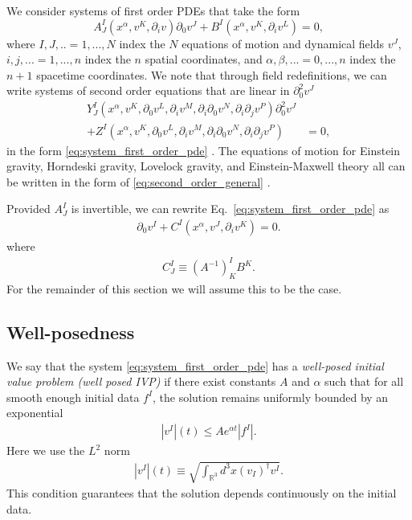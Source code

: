 \documentclass{ws-ijmpd}
\begin{document}
We consider systems of first order PDEs that take the form
\begin{equation}
\label{eq:system_first_order_pde}
   A^I_J\left(x^{\alpha},v^K,\partial_iv\right)\partial_0v^J
   +
   B^I\left(x^{\alpha},v^K,\partial_iv^L\right)
   =
   0
   ,
\end{equation} 
where $I,J,..=1,...,N$ index the $N$ 
equations of motion and dynamical fields $v^J$,
$i,j,...=1,...,n$ index the $n$ spatial coordinates, 
and $\alpha,\beta,...=0,...,n$ index
the $n+1$ spacetime coordinates.
We note that through field redefinitions, we can write
systems of second order equations that are linear in $\partial_0^2v^J$
\begin{align}
\label{eq:second_order_general}
   Y^I_J\left(
      x^{\alpha},
      v^K,
      \partial_0v^L,
      \partial_iv^M,
      \partial_i\partial_0v^N,
      \partial_i\partial_jv^P
   \right)
   \partial_0^2v^J
   &\nonumber\\
   +
   Z^I\left(
      x^{\alpha},
      v^K,
      \partial_0v^L,
      \partial_iv^M,
      \partial_i\partial_0v^N,
      \partial_i\partial_jv^P
   \right)
   &=
   0
   ,
\end{align}
in the form 
\eqref{eq:system_first_order_pde}
\cite{Sarbach:2012pr,Hilditch:2013sba,Kovacs:2020pns}.
The equations of motion for Einstein gravity, 
Horndeski gravity, Lovelock
gravity, and Einstein-Maxwell theory all can be
written in the form of
\eqref{eq:second_order_general}
\cite{Papallo:2017qvl,Kovacs:2020pns,Davies:2021frz}.

Provided $A^I_J$ is invertible, we can rewrite
Eq.~\eqref{eq:system_first_order_pde} as
\begin{align}
\label{eq:system_first_order_pde_C}
   \partial_0v^I
   +
   C^I\left(x^{\alpha},v^J,\partial_iv^K\right)
   =
   0
   .
\end{align}
where
\begin{align}
   C^I_J
   \equiv
   \left(A^{-1}\right)^I_KB^K
   .
\end{align}
For the remainder of this section we will assume this to be the case.

\subsection{Well-posedness
\label{sec:well_posedness}
}

We say that the system \eqref{eq:system_first_order_pde} has a
\emph{well-posed initial value problem (well posed IVP)} if there
exist constants $A$ and $\alpha$ such that for all smooth enough
initial data $f^I$, the solution remains uniformly bounded by an exponential
\begin{align}
   \left|v^I\right|(t)
   \leq
   A e^{\alpha t} \left|f^I\right|
   .
\end{align}
Here we use the $L^2$ norm
\begin{align}
   \left|v^I\right|(t)
   \equiv
   \sqrt{
      \int_{\mathbb{R}^3} d^3x \left(v_I\right)^{\dagger} v^I
   }
   .
\end{align}
This condition guarantees that the
solution depends continuously on the initial data. 
\end{document}
